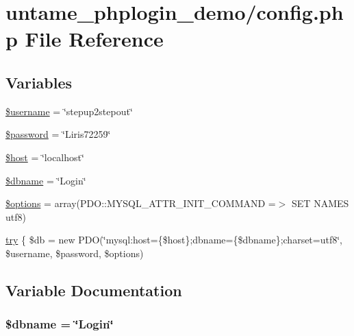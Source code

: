 \hypertarget{config_8php}{}\section{untame\+\_\+phplogin\+\_\+demo/config.php File Reference}
\label{config_8php}
\subsection*{Variables}
\begin{DoxyCompactItemize}
\item 
\hyperlink{config_8php_a0eb82aa5f81cf845de4b36cd653c42cf}{\$username} = \char`\"{}stepup2stepout\char`\"{}
\item 
\hyperlink{config_8php_a607686ef9f99ea7c42f4f3dd3dbb2b0d}{\$password} = \char`\"{}Liris72259\char`\"{}
\item 
\hyperlink{config_8php_a711797613cb863ca0756df789c396bf2}{\$host} = \char`\"{}localhost\char`\"{}
\item 
\hyperlink{config_8php_ac5111a571fffa2499732833bb7f0d8c1}{\$dbname} = \char`\"{}Login\char`\"{}
\item 
\hyperlink{config_8php_a011800c63ece4cbbfa77136a20607023}{\$options} = array(P\+D\+O\+::\+M\+Y\+S\+Q\+L\+\_\+\+A\+T\+T\+R\+\_\+\+I\+N\+I\+T\+\_\+\+C\+O\+M\+M\+A\+N\+D =$>$ \textquotesingle{}S\+E\+T N\+A\+M\+E\+S utf8\textquotesingle{})
\item 
\hyperlink{config_8php_abe4cc9788f52e49485473dc699537388}{try} \{ \$db = new P\+D\+O(\char`\"{}mysql\+:host=\{\$host\};dbname=\{\$dbname\};charset=utf8\char`\"{}, \$username, \$password, \$options)
\end{DoxyCompactItemize}


\subsection{Variable Documentation}
\hypertarget{config_8php_ac5111a571fffa2499732833bb7f0d8c1}{}
\subsubsection[{\$dbname}]{\setlength{\rightskip}{0pt plus 5cm}\$dbname = \char`\"{}Login\char`\"{}}\label{config_8php_ac5111a571fffa2499732833bb7f0d8c1}
\hypertarget{config_8php_a711797613cb863ca0756df789c396bf2}{}
